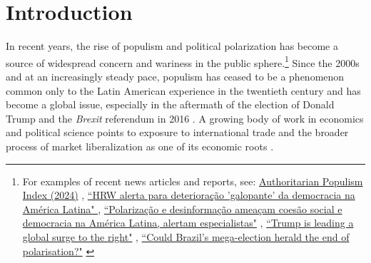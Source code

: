 \documentclass[
	11pt,				%
	oneside,			%
	a4paper,			%
	english,			%
	english				%
	]{abntex2ppgsi}
\theoremstyle{plain}
\theoremstyle{remark}
\theoremstyle{plain}%
\theoremstyle{remark}%
\begin{document}
\textual


\chapter{Introduction}
\label{ch:introduction}



In recent years, the rise of populism and political polarization has become a source of widespread concern and wariness in the public sphere.\footnote{For examples of recent news articles and reports, see: \href{https://populismindex.com/report/}{Authoritarian Populism Index (2024)} \cite{index}, \href{https://noticias.uol.com.br/ultimas-noticias/afp/2025/01/16/hrw-alerta-para-deterioracao-galopante-da-democracia-na-america-latina.com}{``HRW alerta para deterioração 'galopante' da democracia na América Latina" \cite{uol}}, \href{https://www.ipea.gov.br/portal/categorias/45-todas-as-noticias/noticias/16008-polarizacao-e-desinformacao-ameacam-coesao-social-e-democracia-na-america-latina-alertam-especialistas.com}{``Polarização e desinformação ameaçam coesão social e democracia na América Latina, alertam especialistas"} \cite{ipea}, \href{https://www.nytimes.com/2025/01/23/world/europe/trump-europe-right-immigration-ukraine.html}{``Trump is leading a global surge to the right"} \cite{nyt}, \href{https://www.economist.com/the-world-ahead/2025/11/12/could-brazils-mega-election-herald-the-end-of-polarisation}{``Could Brazil's mega-election herald the end of polarisation?"}  \cite{economist}} Since the 2000s and at an increasingly steady pace, populism has ceased to be a phenomenon common only to the Latin American experience in the twentieth century and has become a global issue, especially in the aftermath of the election of Donald Trump and the \emph{Brexit} referendum in 2016 \cite{Scheiring}. A growing body of work in economics and political science points to exposure to international trade and the broader process of market liberalization as one of its economic roots \cite{Rodrik, rodrik2, Autor}.
\end{document}
